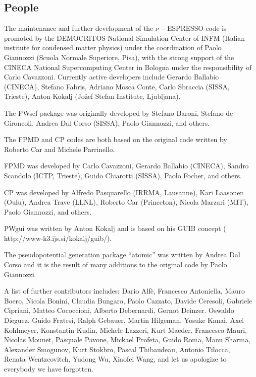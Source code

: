 \documentclass[12pt,a4paper]{article}
\begin{document}
\subsection{People}

The maintenance and further development of the $\nu-$ESPRESSO code is
promoted by the DEMOCRITOS National Simulation Center of INFM (Italian
institute for condensed matter physics) under the coordination of
Paolo Giannozzi (Scuola Normale Superiore, Pisa), with the strong
support of the CINECA National Supercomputing Center in Bologna under
the responsibility of Carlo Cavazzoni.
Currently active developers include
Gerardo Ballabio (CINECA),
Stefano Fabris, Adriano Mosca Conte, Carlo Sbraccia
(SISSA, Trieste),
Anton Kokalj (Jo\v{z}ef Stefan Institute, Ljubljana).

The PWscf package was originally developed by Stefano Baroni, Stefano
de Gironcoli, Andrea Dal Corso (SISSA), Paolo Giannozzi, and others.

The FPMD and CP codes are both based on the original code written by
Roberto Car and Michele Parrinello.

FPMD was developed by
Carlo Cavazzoni, Gerardo Ballabio (CINECA),
Sandro Scandolo (ICTP, Trieste),
Guido Chiarotti (SISSA),
Paolo Focher,
and others.

CP was developed by
Alfredo Pasquarello (IRRMA, Lausanne),
Kari Laasonen (Oulu),
Andrea Trave (LLNL),
Roberto Car (Princeton),
Nicola Marzari (MIT),
Paolo Giannozzi,
and others.

PWgui was written by Anton Kokalj and is based on his GUIB concept
(%
                   {http://www-k3.ijs.si/kokalj/guib/}).

The pseudopotential generation package ``atomic'' was written by
Andrea Dal Corso and it is the result of many additions to the
original code by Paolo Giannozzi.

A list of further contributors includes:
Dario Alf\`e,
Francesco Antoniella,
Mauro Boero,
Nicola Bonini,
Claudia Bungaro,
Paolo Cazzato,
Davide Ceresoli,
Gabriele Cipriani,
Matteo Cococcioni,
Alberto Debernardi,
Gernot Deinzer.
Oswaldo Dieguez,
Guido Fratesi,
Ralph Gebauer,
Martin Hilgeman,
Yosuke Kanai,
Axel Kohlmeyer,
Konstantin Kudin,
Michele Lazzeri,
Kurt Maeder,
Francesco Mauri,
Nicolas Mounet,
Pasquale Pavone,
Mickael Profeta,
Guido Roma,
Manu Sharma,
Alexander Smogunov,
Kurt Stokbro,
Pascal Thibaudeau,
Antonio Tilocca,
Renata Wentzcovitch,
Yudong Wu,
Xiaofei Wang,
and let us apologize to everybody we have forgotten.
\end{document}
